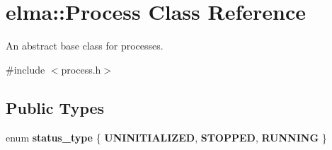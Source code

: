 \hypertarget{classelma_1_1_process}{}\section{elma\+::Process Class Reference}
\label{classelma_1_1_process}


An abstract base class for processes.  




{\ttfamily \#include $<$process.\+h$>$}

\subsection*{Public Types}
\begin{DoxyCompactItemize}
\item 
\mbox{\label{classelma_1_1_process_a355d4150a5de734fcb8ff654b7eabf3e}} 
enum {\bfseries status\+\_\+type} \{ {\bfseries U\+N\+I\+N\+I\+T\+I\+A\+L\+I\+Z\+ED}, 
{\bfseries S\+T\+O\+P\+P\+ED}, 
{\bfseries R\+U\+N\+N\+I\+NG}
 \}
\end{DoxyCompactItemize}
